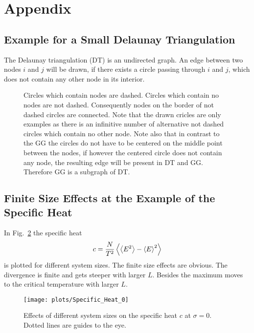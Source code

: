 \section{Appendix}
\subsection{Example for a Small Delaunay Triangulation}
\label{appendix:DT_def}
    The Delaunay triangulation (DT) is an undirected graph. An edge
    between two nodes \(i\) and \(j\) will be drawn, if there exists
    a circle passing through \(i\) and \(j\), which does not contain
    any other node in its interior.
    \begin{figure}[htbp]
    \centering
        
        \caption[Example for a Small Delaunay Triangulation]
        {
            Circles which contain nodes are dashed.
            Circles which contain no nodes are not dashed.
            Consequently nodes on the border of not dashed circles are
            connected. Note that the drawn cricles are only examples
            as there is an infinitive number of alternative not
            dashed circles which contain no other node.
            Note also that in contrast to the GG the circles do not
            have to be centered on the middle point between the nodes, if
            however the centered circle does not contain any node, the
            resulting edge will be present in DT and GG. Therefore GG is
            a subgraph of DT.
        }
        \label{fig:def:DT}
    \end{figure}

\subsection{Finite Size Effects at the Example of the Specific Heat}
\label{appendix:finiteSizeEffects}
    In Fig.\ \ref{fig:smeared_out_appendix} the specific heat
    \begin{equation}
        c = \frac{N}{T^2}\left< \left< E^2 \right> - \left< E \right>^2 \right>
    \end{equation}
    is plotted for different system sizes. The finite size effects are obvious.
    The divergence is finite and gets steeper with larger \(L\). Besides
    the maximum moves to the critical temperature with larger \(L\).
    \begin{figure}[htbp]
        \centering
        \texttt{[image: plots/Specific\_Heat\_0]}
        \caption[Finite Size Effects by Example of the Specific Heat]
        {
            Effects of different system sizes on the specific heat \(c\)
            at \(\sigma = 0\). Dotted lines are guides to the eye.
        }
        \label{fig:smeared_out_appendix}
    \end{figure}
